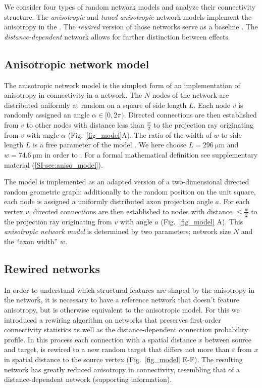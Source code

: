 
We consider four types of random network models and analyze their
connectivity structure. The \textit{anisotropic} and \textit{tuned
anisotropic} network models implement the anisotropy in the
. The \textit{rewired} version of those networks serve as a baseline
. The \textit{distance-dependent} network allows for further
distinction between effects.

\subsection*{Anisotropic network model}

The anisotropic network model is the simplest form of an
implementation of anisotropy in connectivity in a network. The $N$
nodes of the network are distributed uniformly at random on a square
of side length $L$. Each node $v$ is randomly assigned an angle
$\alpha \in [0,2\pi)$. Directed connections are then established from
$v$ to other nodes with distance less than $\frac{w}{2}$ to the
projection ray originating from $v$ with angle $\alpha$
(Fig.~\ref{fig_model}A). The ratio of the width of $w$ to side length
$L$ is a free parameter of the model . We here choose
$L=\SI{296}{\micro\meter}$ and $w=\SI{74.6}{\micro\meter}$ in order
to . For a formal mathematical definition see supplementary material
(\ref{SI-sec:aniso_model}).




The model is implemented as an adapted version of a two-dimensional
directed random geometric graph: additionally to the random position
on the unit square, each node is assigned a uniformly distributed axon
projection angle $a$. For each vertex $v$, directed connections are
then established to nodes with distance $\leq \frac{w}{2}$ to the
projection ray originating from $v$ with angle $a$
(Fig.~\ref{fig_model} A). This \textit{anisotropic network
  model} is determined by two parameters; network size $N$ and the
\enquote{axon width} $w$.




\subsection*{Rewired networks}
%
In order to understand which structural features are shaped by the
anisotropy in the network, it is necessary to have a reference network
that doesn't feature anisotropy, but is otherwise equivalent to the
anisotropic model. For this we introduced a rewiring algorithm on
networks that preserves first-order connectivity statistics %
as well as the distance-dependent connection probability profile. In
this process each connection with a spatial distance $x$ between
source and target, is rewired to a new random target that differs not
more than $\varepsilon$ from $x$ in spatial distance to the source
vertex (Fig.~\ref{fig_model} E-F). The resulting network has greatly
reduced anisotropy in connectivity, resembling that of a
distance-dependent network (supporting information).

